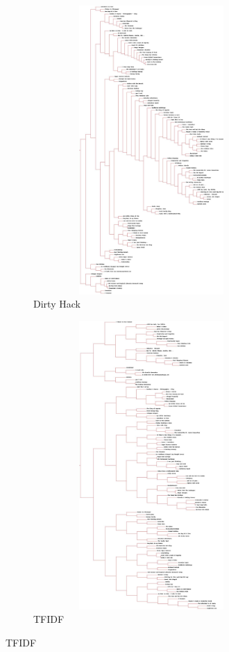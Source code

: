 \begin{figure}[t!]
        \centering
        \begin{subfigure}{0.5\textwidth}
	\centering
	 \includegraphics[height=11cm, width=9cm]{../q2/blogdendro.jpg}

             \caption{Dirty Hack}
        \end{subfigure}%
        \begin{subfigure}{0.5\textwidth}
		\centering
               \includegraphics[height=11cm, width=9cm]{../qec/blogdendro}	
\caption{TFIDF}
        \end{subfigure}
    
\end{figure}



